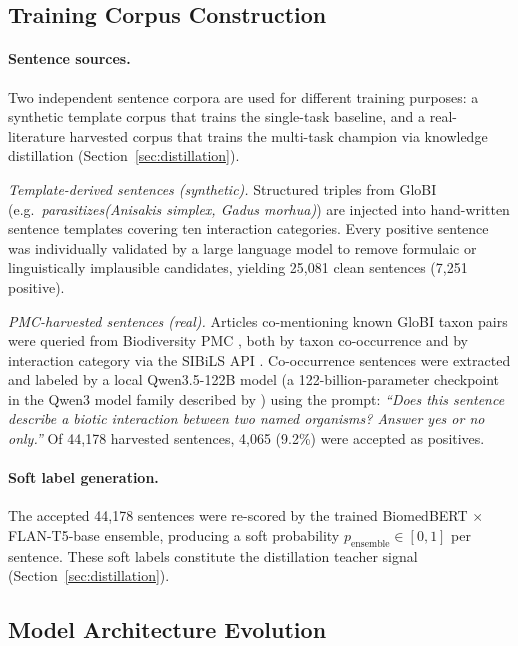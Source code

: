 \documentclass[11pt,twocolumn]{article}
\begin{document}
\subsection{Training Corpus Construction}
\label{sec:data}

\paragraph{Sentence sources.}
Two independent sentence corpora are used for different training
purposes: a synthetic template corpus that trains the single-task
baseline, and a real-literature harvested corpus that trains the
multi-task champion via knowledge distillation (Section~\ref{sec:distillation}).

\emph{Template-derived sentences (synthetic).}
Structured triples from GloBI (e.g.\ \textit{parasitizes(Anisakis simplex,
Gadus morhua)}) are injected into hand-written sentence templates covering
ten interaction categories. Every positive sentence was individually
validated by a large language model to remove formulaic or linguistically
implausible candidates, yielding 25,081 clean sentences (7,251 positive).

\emph{PMC-harvested sentences (real).}
Articles co-mentioning known GloBI taxon pairs were queried from
Biodiversity PMC \citep{biodiversitypmc2024}, both by taxon co-occurrence
and by interaction category via the SIBiLS API \citep{mottin2021sibils}.
Co-occurrence sentences were extracted and labeled by a local Qwen3.5-122B
model (a 122-billion-parameter checkpoint in the Qwen3 model family
described by \citealt{qwen2025technical})
using the prompt:
\textit{``Does this sentence describe a biotic interaction between two named
organisms? Answer yes or no only.''}
Of 44,178 harvested sentences, 4,065 (9.2\%) were accepted as positives.

\paragraph{Soft label generation.}
The accepted 44,178 sentences were re-scored by the trained BiomedBERT
$\times$ FLAN-T5-base ensemble, producing a soft probability
$p_\text{ensemble} \in [0,1]$ per sentence. These soft labels constitute
the distillation teacher signal (Section~\ref{sec:distillation}).

\subsection{Model Architecture Evolution}
\label{sec:architectures}
\end{document}
